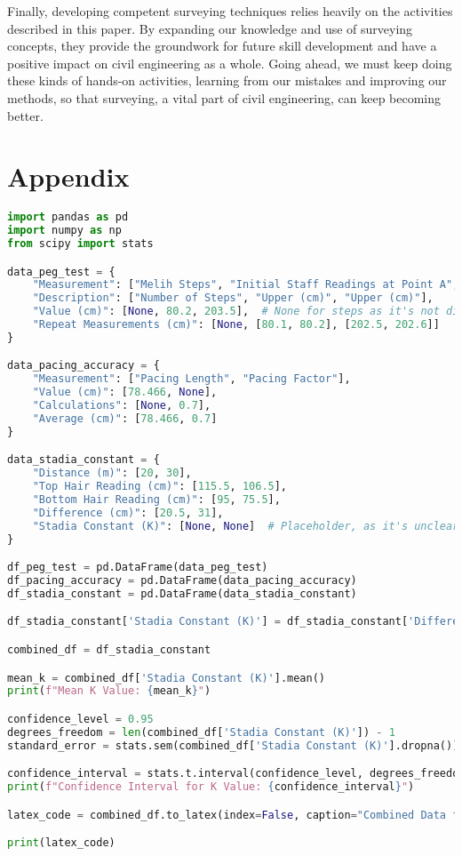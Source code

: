 \documentclass[12pt]{report}
\begin{document}
Finally, developing competent surveying techniques relies heavily on the activities described in this paper. By expanding our knowledge and use of surveying concepts, they provide the groundwork for future skill development and have a positive impact on civil engineering as a whole. Going ahead, we must keep doing these kinds of hands-on activities, learning from our mistakes and improving our methods, so that surveying, a vital part of civil engineering, can keep becoming better.



\section*{Appendix}

\begin{lstlisting}[language=Python]
import pandas as pd
import numpy as np
from scipy import stats

data_peg_test = {
    "Measurement": ["Melih Steps", "Initial Staff Readings at Point A", "Initial Staff Readings at Point B"],
    "Description": ["Number of Steps", "Upper (cm)", "Upper (cm)"],
    "Value (cm)": [None, 80.2, 203.5],  # None for steps as it's not directly relevant to calculations here
    "Repeat Measurements (cm)": [None, [80.1, 80.2], [202.5, 202.6]]
}

data_pacing_accuracy = {
    "Measurement": ["Pacing Length", "Pacing Factor"],
    "Value (cm)": [78.466, None],
    "Calculations": [None, 0.7],
    "Average (cm)": [78.466, 0.7]
}

data_stadia_constant = {
    "Distance (m)": [20, 30],
    "Top Hair Reading (cm)": [115.5, 106.5],
    "Bottom Hair Reading (cm)": [95, 75.5],
    "Difference (cm)": [20.5, 31],
    "Stadia Constant (K)": [None, None]  # Placeholder, as it's unclear how to calculate without formula
}

df_peg_test = pd.DataFrame(data_peg_test)
df_pacing_accuracy = pd.DataFrame(data_pacing_accuracy)
df_stadia_constant = pd.DataFrame(data_stadia_constant)

df_stadia_constant['Stadia Constant (K)'] = df_stadia_constant['Difference (cm)'] / df_stadia_constant['Distance (m)']

combined_df = df_stadia_constant

mean_k = combined_df['Stadia Constant (K)'].mean()
print(f"Mean K Value: {mean_k}")

confidence_level = 0.95
degrees_freedom = len(combined_df['Stadia Constant (K)']) - 1
standard_error = stats.sem(combined_df['Stadia Constant (K)'].dropna())

confidence_interval = stats.t.interval(confidence_level, degrees_freedom, mean_k, standard_error)
print(f"Confidence Interval for K Value: {confidence_interval}")

latex_code = combined_df.to_latex(index=False, caption="Combined Data for Stadia Method Calculations", label="table:combined_stadia", longtable=True, column_format="lcccc", header=["Distance (m)", "Top Hair Reading (cm)", "Bottom Hair Reading (cm)", "Difference (cm)", "Stadia Constant (K)"])

print(latex_code)
\end{lstlisting}
\end{document}
